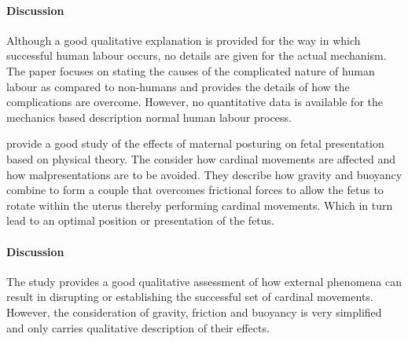   \paragraph{Discussion} Although a good qualitative explanation is provided for the way in which successful human labour occurs, no details are given for the actual mechanism. The paper focuses on stating the causes of the complicated nature of human labour as compared to non-humans and provides the details of how the complications are overcome. However, no quantitative data is available for the mechanics based description normal human labour process.

  \citet{Andrews2004} provide a good study of the effects of maternal posturing on fetal presentation based on physical theory. The consider how cardinal movements are affected and how malpresentations are to be avoided. They describe how gravity and buoyancy combine to form a couple that overcomes frictional forces to allow the fetus to rotate within the uterus thereby performing cardinal movements. Which in turn lead to an optimal position or presentation of the fetus.

  \paragraph{Discussion} The study provides a good qualitative assessment of how external phenomena can result in disrupting or establishing the successful set of cardinal movements. However, the consideration of gravity, friction and buoyancy is very simplified and only carries qualitative description of their effects.

